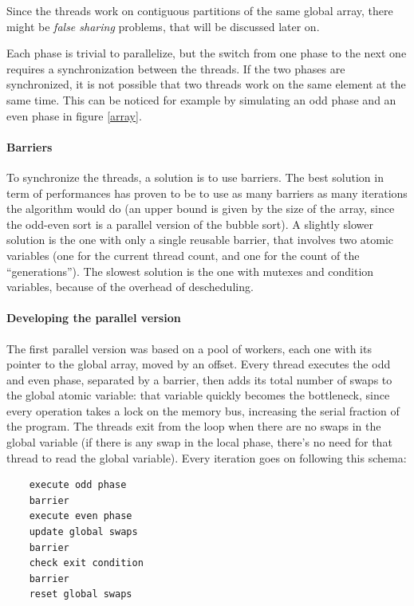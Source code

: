 Since the threads work on contiguous partitions of the same global array, there might be \textit{false sharing} problems, that will be discussed later on.

Each phase is trivial to parallelize, but the switch from one phase to the next one requires a synchronization between the threads. If the two phases are synchronized, it is not possible that two threads work on the same element at the same time. This can be noticed for example by simulating an odd phase and an even phase in figure \ref{array}.

\paragraph{Barriers}
To synchronize the threads, a solution is to use barriers. The best solution in term of performances has proven to be to use as many barriers as many iterations the algorithm would do (an upper bound is given by the size of the array, since the odd-even sort is a parallel version of the bubble sort). A slightly slower solution is the one with only a single reusable barrier, that involves two atomic variables (one for the current thread count, and one for the count of the ``generations''). The slowest solution is the one with mutexes and condition variables, because of the overhead of descheduling.

\paragraph{Developing the parallel version}
The first parallel version was based on a pool of workers, each one with its pointer to the global array, moved by an offset. Every thread executes the odd and even phase, separated by a barrier, then adds its total number of swaps to the global atomic variable: that variable quickly becomes the bottleneck, since every operation takes a lock on the memory bus, increasing the serial fraction of the program. The threads exit from the loop when there are no swaps in the global variable (if there is any swap in the local phase, there's no need for that thread to read the global variable). Every iteration goes on following this schema:
\begin{verbatim}
    execute odd phase
    barrier
    execute even phase
    update global swaps
    barrier
    check exit condition
    barrier
    reset global swaps
\end{verbatim}

